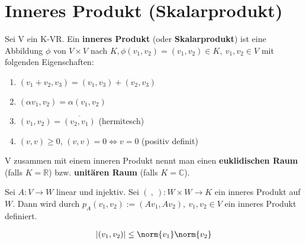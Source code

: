 \chapter{Inneres Produkt (Skalarprodukt)}
\begin{definition}
Sei V ein K-VR. Ein \textbf{inneres Produkt} (oder \textbf{Skalarprodukt}) ist eine Abbildung $\phi$ von $V \times V$ nach $K, \phi (v_1,v_2) = (v_1,v_2) \in K,~v_1,v_2 \in V$ mit folgenden Eigenschaften:
\begin{enumerate}
	\item $(v_1+v_2,v_3) = (v_1,v_3)+(v_2,v_3)$
	\item $(\alpha v_1,v_2) = \alpha (v_1,v_2)$
	\item $(v_1,v_2) = \overline{(v_2,v_1)}$ (hermitesch)
	\item $(v,v) \geq 0$, $(v,v) = 0 \Leftrightarrow v=0$ (positiv definit)
\end{enumerate}
\end{definition}
\begin{remark}
V zusammen mit einem inneren Produkt nennt man einen \textbf{euklidischen Raum} (falls $K=\mathbb{R}$) bzw. \textbf{unitären Raum} (falls $K=\mathbb{C}$).
\end{remark}

\begin{lemma}
Sei $A:V \rightarrow W$ linear und injektiv. Sei $(~,~):W \times W \rightarrow K$ ein inneres Produkt auf $W$. Dann wird durch $p_A(v_1,v_2):=(Av_1,Av_2),~v_1,v_2 \in V$ ein inneres Produkt definiert.
\end{lemma}

\begin{theorem}
\begin{align*}
|(v_1,v_2)| \leq \norm{v_1} \norm{v_2}
\end{align*}
\end{theorem}

